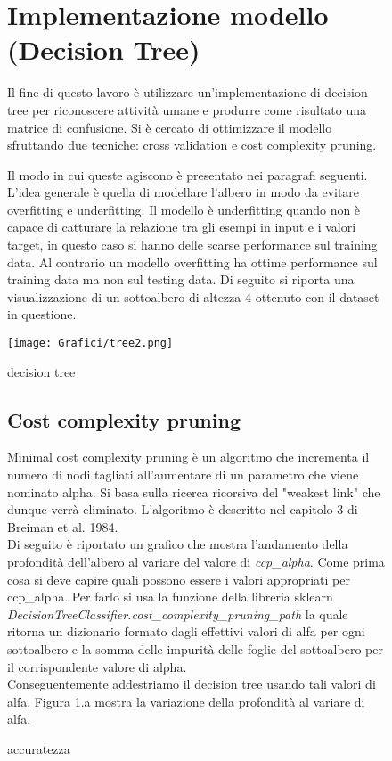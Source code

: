 \documentclass[]{article}
\begin{document}
\begin{figure}
\section{Implementazione modello (Decision Tree)}
Il fine di questo lavoro è utilizzare un'implementazione di decision tree per riconoscere attività umane e produrre come risultato una matrice di confusione. 
Si è cercato di ottimizzare il modello sfruttando due tecniche: cross validation e cost complexity pruning.\\

\end{figure}
\begin{figure}
Il modo in cui queste agiscono è presentato nei paragrafi seguenti. L'idea generale è quella di modellare l'albero in modo da evitare overfitting e underfitting. Il modello è underfitting quando non è capace di catturare la relazione tra gli esempi in input e i valori target, in questo caso si hanno delle scarse performance sul training data. Al contrario un modello overfitting ha ottime performance sul training data ma non sul testing data.
Di seguito si riporta una visualizzazione di un sottoalbero di altezza 4 ottenuto con il dataset in questione.
\\
\begin{center}
\texttt{[image: Grafici/tree2.png]} 
\caption{decision tree}
\end{center}


\subsection{Cost complexity pruning}
Minimal cost complexity pruning è un algoritmo che incrementa il numero di nodi tagliati all'aumentare di un parametro che viene nominato alpha. Si basa sulla ricerca ricorsiva del "weakest link" che dunque verrà eliminato. L'algoritmo è descritto nel capitolo 3 di Breiman et al. 1984. \\
Di seguito è riportato un grafico che mostra l'andamento della profondità dell'albero al variare del valore di \textit{ccp\_alpha}.
Come prima cosa si deve capire quali possono essere i valori appropriati per ccp\_alpha. Per farlo si usa la funzione della libreria sklearn \textit{DecisionTreeClassifier.cost\_complexity\_pruning\_path} la quale ritorna un dizionario formato dagli effettivi valori di alfa per ogni sottoalbero e la somma delle impurità delle foglie del sottoalbero per il corrispondente valore di alpha.\\
Conseguentemente addestriamo il decision tree usando tali valori di alfa. Figura 1.a mostra la variazione della profondità al variare di alfa. 
\begin{center}
\hspace*{\fill}
\caption{accuratezza}
\end{center}
\end{figure}
\end{document}
